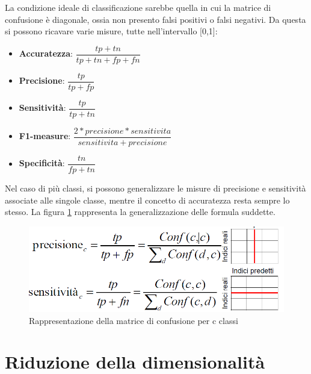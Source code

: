 La condizione ideale di classificazione sarebbe quella in cui la matrice di confusione è diagonale, ossia non presento falsi positivi o falsi negativi. Da questa si possono ricavare varie misure, tutte nell'intervallo [0,1]:
\begin{itemize}
	\item \textbf{Accuratezza}: $\dfrac{tp+tn}{tp+tn+fp+fn}$
	\item \textbf{Precisione}: $\dfrac{tp}{tp+fp}$
	\item \textbf{Sensitività}: $\dfrac{tp}{tp+tn}$
	\item \textbf{F1-measure}: $\dfrac{2*precisione*sensitivita }{sensitivita + precisione}$
	\item \textbf{Specificità}: $\dfrac{tn}{fp+tn}$
\end{itemize}
Nel caso di più classi, si possono generalizzare le misure di precisione e sensitività associate alle singole classe, mentre il concetto di accuratezza resta sempre lo stesso. La figura \ref{immagine_matrice_confusione_cclassi} rappresenta la generalizzazione delle formula suddette.
\begin{figure}[h!]
	\centering
	\includegraphics[width=1\textwidth]{images/matrice_confusione_cclassi.png}
	\caption{Rappresentazione della matrice di confusione per c classi}
	\label{immagine_matrice_confusione_cclassi}
\end{figure}

\section{Riduzione della dimensionalità}
